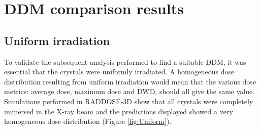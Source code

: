 \section{DDM comparison results}
\label{sec:DDM Comparison results}

\subsection{Uniform irradiation}
\label{sub:Uniform irradiation}

To validate the subsequent analysis performed to find a suitable DDM, it was essential that the crystals were uniformly irradiated.
A homogeneous dose distribution resulting from uniform irradiation would mean that the various dose metrics: average dose, maximum dose and DWD, should all give the same value.
Simulations performed in RADDOSE-3D show that all crystals were completely immersed in the X-ray beam and the predictions displayed showed a very homogeneous dose distribution (Figure \ref{fig:Uniform}).
